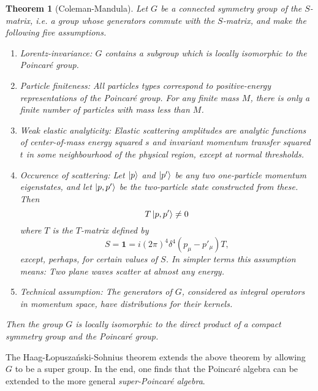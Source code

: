 \documentclass[a4paper]{report}
\theoremstyle{definition}
\theoremstyle{plain}
\newtheorem{theorem}{Theorem}[section]
\theoremstyle{remark}
\begin{document}
\begin{theorem}[Coleman-Mandula]
  Let $G$ be a connected symmetry group of the $S$-matrix, i.e. a group whose generators commute with the $S$-matrix, and make the following five assumptions.
  \begin{enumerate}
    \item \emph{Lorentz-invariance:} $G$ contains a subgroup which is locally isomorphic to the Poincar{\'e} group.

    \item \emph{Particle finiteness:} All particles types correspond to positive-energy representations of the Poincar{\'e} group. For any finite mass $M$, there is only a finite number of particles with mass less than $M$.

    \item \emph{Weak elastic analyticity:} Elastic scattering amplitudes are analytic functions of center-of-mass energy squared $s$ and invariant momentum transfer squared $t$ in some neighbourhood of the physical region, except at normal thresholds.

    \item \emph{Occurence of scattering:} Let $\ket{p}$ and $\ket{p'}$ be any two one-particle momentum eigenstates, and let $\ket{p, p'}$ be the two-particle state constructed from these. Then
      \begin{equation*}
        T\ket{p, p'} \neq 0
      \end{equation*}
      where $T$ is the $T$-matrix defined by
      \begin{equation*}
        S = \mathbf{1} = i (2\pi)^{4} \delta^{4}(p_{\mu} - p'_{\mu}) T,
      \end{equation*}
      except, perhaps, for certain values of $S$. In simpler terms this assumption means: Two plane waves scatter at almost any energy.

    \item \emph{Technical assumption:} The generators of $G$, considered as integral operators in momentum space, have distributions for their kernels.
  \end{enumerate}

  Then the group $G$ is locally isomorphic to the direct product of a compact symmetry group and the Poincar{\'e} group.
\end{theorem}

The Haag-{\L}opusza{\'n}ski-Sohnius theorem extends the above theorem by allowing $G$ to be a super group. In the end, one finds that the Poincar{\'e} algebra can be extended to the more general \emph{super-Poincar{\'e} algebra}.
\end{document}
